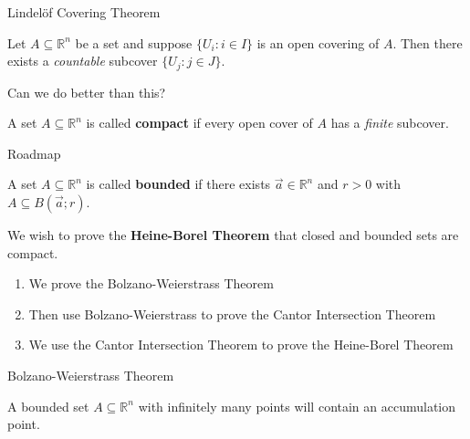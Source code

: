 \documentclass{beamer}
\begin{document}
\begin{frame}{Lindel\"{o}f Covering Theorem}
\begin{thm}
Let $A\subseteq\mathbb{R}^n$ be a set and suppose $\{U_i: i\in I\}$ is an open covering of $A$.
Then there exists a \emph{countable} subcover $\{U_j: j\in J\}.$
\end{thm}
\pause
\begin{quest}
Can we do better than this?
\end{quest}
\pause
\begin{defn}
A set $A\subseteq\mathbb{R}^n$ is called \textbf{compact} if every open cover of $A$ has a \emph{finite} subcover.
\end{defn}
\end{frame}

\begin{frame}{Roadmap}
\begin{defn}
A set $A\subseteq\mathbb{R}^n$ is called \textbf{bounded} if there exists $\vec a\in\mathbb{R}^n$ and $r>0$ with $A\subseteq B(\vec a;r)$.
\end{defn}
\pause
We wish to prove the \textbf{Heine-Borel Theorem} that closed and bounded sets are compact.
\begin{enumerate}
\pause
\item We prove the Bolzano-Weierstrass Theorem
\pause
\item Then use Bolzano-Weierstrass to prove the Cantor Intersection Theorem
\pause
\item We use the Cantor Intersection Theorem to prove the Heine-Borel Theorem
\end{enumerate}
\end{frame}

\begin{frame}{Bolzano-Weierstrass Theorem}
\begin{thm}
A bounded set $A\subseteq \mathbb{R}^n$ with infinitely many points will contain an accumulation point.
\end{thm}
\end{frame}
\end{document}
